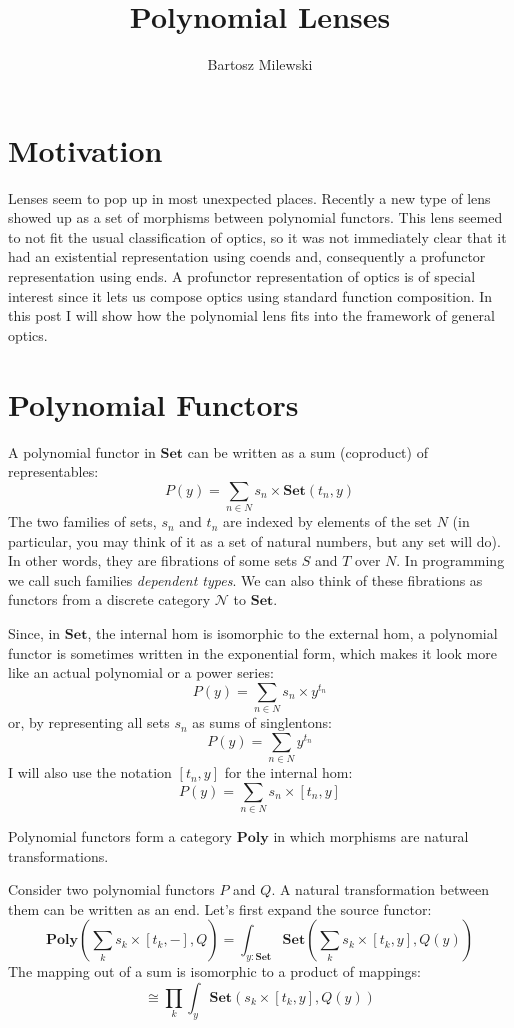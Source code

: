 \documentclass[11pt]{amsart}
\author{Bartosz Milewski}
\title{Polynomial Lenses}
\begin{document}
\maketitle{}

\section{Motivation}
Lenses seem to pop up in most unexpected places. Recently a new type of lens showed up as a set of morphisms between polynomial functors. This lens seemed to not fit the usual classification of optics, so it was not immediately clear that it had an existential representation using coends and, consequently a profunctor representation using ends. A profunctor representation of optics is of special interest since it lets us compose optics using standard function composition. In this post I will show how the polynomial lens fits into the framework of general optics.

\section{Polynomial Functors}

A polynomial functor in $\mathbf{Set}$ can be written as a sum (coproduct) of representables:
\[ P(y) = \sum_{n \in N} s_n \times \mathbf{Set}(t_n, y) \]
The two families of sets, $s_n$ and $t_n$ are indexed by elements of the set $N$ (in particular, you may think of it as a set of natural numbers, but any set will do). In other words, they are fibrations of some sets $S$ and $T$ over $N$. In programming we call such families \emph{dependent types}. We can also think of these fibrations as functors from a discrete category $\mathcal{N}$ to $\mathbf{Set}$. 

Since, in $\mathbf{Set}$, the internal hom is isomorphic to the external hom, a polynomial functor is sometimes written in the exponential form, which makes it look more like an actual polynomial or a power series:
\[ P(y) = \sum_{n \in N} s_n \times y^{t_n} \]
or, by representing all sets $s_n$ as sums of singlentons:
\[ P(y) = \sum_{n \in N} y^{t_n} \]
I will also use the notation $[t_n, y]$ for the internal hom:
\[ P(y) = \sum_{n \in N} s_n \times [t_n, y] \]
  
Polynomial functors form a category $\mathbf{Poly}$ in which morphisms are natural transformations. 

Consider two polynomial functors $P$ and $Q$. A natural transformation between them can be written as an end. Let's first expand the source functor:
\[   \mathbf{Poly}\left( \sum_k s_k \times [t_k, -], Q\right)  =  \int_{y\colon \mathbf{Set}} \mathbf{Set} \left(\sum_k s_k \times [t_k, y], Q(y)\right)\]
The mapping out of a sum is isomorphic to a product of mappings:
\[ \cong \prod_k \int_y \mathbf{Set} \left(s_k \times [t_k, y], Q(y)\right) \]
\end{document}
